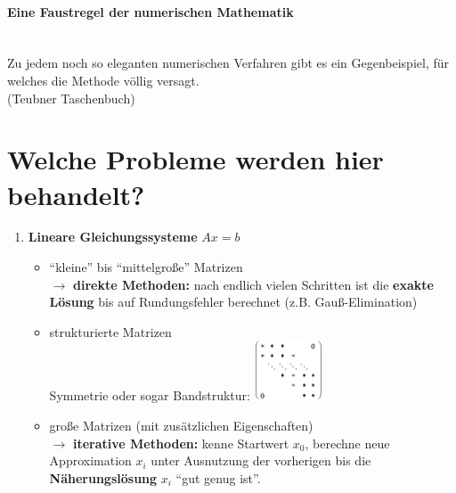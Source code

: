 \paragraph{Eine Faustregel der numerischen Mathematik}~\\
Zu jedem noch so eleganten numerischen Verfahren gibt es ein Gegenbeispiel,
für welches die Methode völlig versagt. \\
{\tiny(Teubner Taschenbuch)}

\section*{Welche Probleme werden hier behandelt?}
\begin{enumerate}
\item \textbf{Lineare Gleichungssysteme} $Ax=b$ 
  \begin{itemize}
  \item \enquote{kleine} bis \enquote{mittelgroße} Matrizen\\
    $\rightarrow$ \textbf{direkte Methoden:} nach endlich vielen
    Schritten ist die \textbf{exakte Lösung} bis auf
    Rundungsfehler berechnet (z.B. Gauß-Elimination)
  \item strukturierte Matrizen \\
    Symmetrie oder sogar Bandstruktur: \hspace*{1cm}  
    \includegraphics[width=2cm]{images/band.jpg}
    
  \item große Matrizen (mit zusätzlichen Eigenschaften)\\
    $\rightarrow$ \textbf{iterative Methoden:} kenne Startwert
    $x_0$, berechne neue Approximation $x_i$ unter
    Ausnutzung der vorherigen bis die
    \textbf{Näherungslösung} $x_i$ \enquote{gut genug ist}.
  \end{itemize}
  

\end{enumerate}
